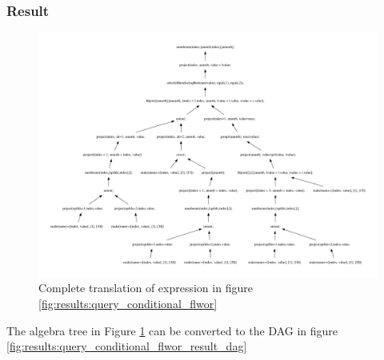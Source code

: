 \subsubsection{Result}
\begin{figure}[!htp]
\begin{center}
  \includegraphics[width=1.0\textwidth]{img/graphs/td_impl_flwor_ifthenelse_xq_relalg}
  \caption{Complete translation of expression in figure
  \ref{fig:results:query_conditional_flwor}}
  \label{fig:results:query_conditional_flwor_result}
\end{center}
\end{figure}

The algebra tree in Figure \ref{fig:results:query_conditional_flwor_result} can
be converted to the DAG in figure
\ref{fig:results:query_conditional_flwor_result_dag}

